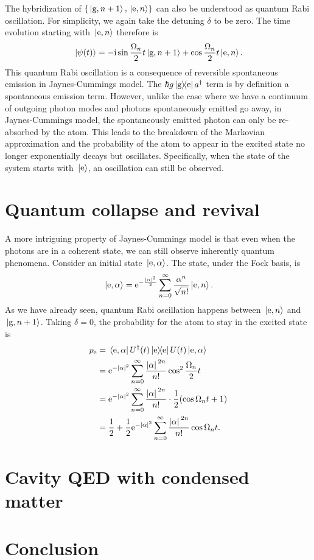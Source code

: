 \documentclass[hyperref, a4paper]{article}
\newcommand*{\ii}{\mathrm{i}}
\newcommand*{\ee}{\mathrm{e}}
\newcommand*{\kete}{\ket*{\text{e}}}
\newcommand*{\dyadge}{\dyad{\text{g}}{\text{e}}}
\newcommand*{\pope}{p_{\text{e}}}
\newcommand*{\statee}{\text{e}}
\newcommand*{\stateg}{\text{g}}
\begin{document}
The hybridization of $\{\ket*{\stateg, n+1}, \ket*{\statee, n}\}$
can also be understood as quantum Rabi oscillation.
For simplicity, we again take the detuning $\delta$ to be zero.
The time evolution starting with $\ket*{\statee, n}$ therefore is 
\begin{equation}
    \ket*{\psi(t)} = - \ii \sin \frac{\Omega_n}{2} t \ket*{\stateg, n+1}  
    + \cos \frac{\Omega_n}{2} t \ket*{\statee, n}.
\end{equation}
This quantum Rabi oscillation is a consequence of reversible spontaneous emission in Jaynes-Cummings model.
The $\hbar g \dyadge a^\dag$ term is by definition a spontaneous emission term.
However, unlike the case where we have a continuum of outgoing photon modes 
and photons spontaneously emitted go away,
in Jaynes-Cummings model, the spontaneously emitted photon can only be re-absorbed by the atom.
This leads to the breakdown of the Markovian approximation
and the probability of the atom to appear in the excited state no longer exponentially decays but oscillates.
Specifically, when the state of the system starts with $\kete$,
an oscillation can still be observed.

\section{Quantum collapse and revival}\label{sec:collapse-revival}

A more intriguing property of Jaynes-Cummings model is that
even when the photons are in a coherent state,
we can still observe inherently quantum phenomena.
Consider an initial state $\ket*{\statee, \alpha}$.
The state, under the Fock basis, is
\begin{equation}
    \ket*{\statee, \alpha} = \ee^{- \frac{\abs*{\alpha}^2}{2}} 
    \sum_{n=0}^{\infty} \frac{\alpha^n}{\sqrt{n!}} \ket*{\text{e}, n}.
\end{equation}
As we have already seen, quantum Rabi oscillation happens between $\ket*{\statee, n}$ and $\ket*{\stateg, n+1}$.
Taking $\delta=0$, the probability for the atom to stay in the excited state is
\begin{equation}
    \begin{aligned}
        \pope &= \bra*{\statee, \alpha} U^\dag(t) \dyad{\statee} U(t) \ket*{\statee, \alpha} \\
        &= \ee^{-\abs{\alpha}^2} \sum_{n=0}^{\infty} \frac{\abs*{\alpha}^{2n}}{n!} \cos^2 \frac{\Omega_n}{2} t \\
        &= \ee^{-\abs{\alpha}^2} \sum_{n=0}^{\infty} \frac{\abs*{\alpha}^{2n}}{n!} \cdot \frac{1}{2} (\cos \Omega_n t + 1) \\
        &= \frac{1}{2} + \frac{1}{2} \ee^{-\abs{\alpha}^2} \sum_{n=0}^{\infty} \frac{\abs*{\alpha}^{2n}}{n!} \cos \Omega_n t .
    \end{aligned}
\end{equation}

\section{Cavity QED with condensed matter}\label{sec:condense}

\section{Conclusion}\label{sec:conclusion}

\printbibliography
\end{document}
